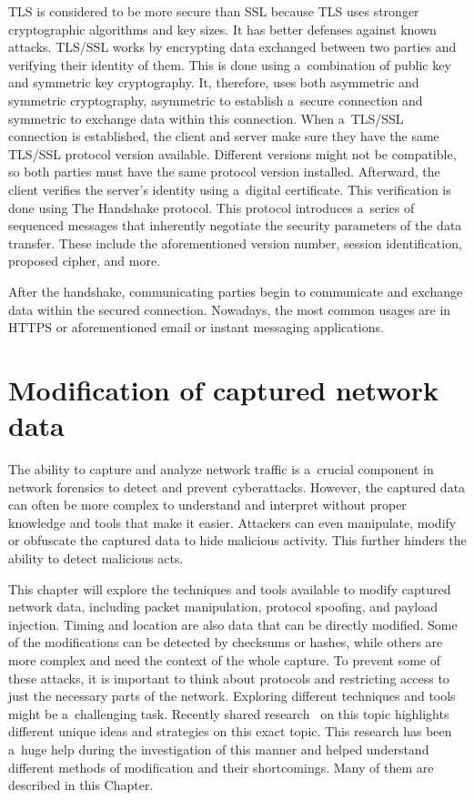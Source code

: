 \documentclass[
  printed,     %
  color,       %
  oneside,     %
  nosansbold,  %
  nocolorbold, %
  nolof,         %
  nolot,         %
]{fithesis4}
\begin{document}
TLS is considered to be more secure than SSL because TLS uses stronger cryptographic algorithms and key sizes. It has better defenses against known attacks. TLS/SSL works by encrypting data exchanged between two parties and verifying their identity of them. This is done using a~combination of public key and symmetric key cryptography. It, therefore, uses both asymmetric and symmetric cryptography, asymmetric to establish a~secure connection and symmetric to exchange data within this connection. When a~TLS/SSL connection is established, the client and server make sure they have the same TLS/SSL protocol version available. Different versions might not be compatible, so both parties must have the same protocol version installed. Afterward, the client verifies the server's identity using a~digital certificate. This verification is done using The Handshake protocol. This protocol introduces a~series of sequenced messages that inherently negotiate the security parameters of the data transfer. These include the aforementioned version number, session identification, proposed cipher, and more.

After the handshake, communicating parties begin to communicate and exchange data within the secured connection. Nowadays, the most common usages are in HTTPS or aforementioned email or instant messaging applications.



\newpage
\chapter{Modification of captured network data}
\label{chap:modif}

The ability to capture and analyze network traffic is a~crucial component in network forensics to detect and prevent cyberattacks. However, the captured data can often be more complex to understand and interpret without proper knowledge and tools that make it easier. Attackers can even manipulate, modify or obfuscate the captured data to hide malicious activity. This further hinders the ability to detect malicious acts.

This chapter will explore the techniques and tools available to modify captured network data, including packet manipulation, protocol spoofing, and payload injection. Timing and location are also data that can be directly modified. Some of the modifications can be detected by checksums or hashes, while others are more complex and need the context of the whole capture. To prevent some of these attacks, it is important to think about protocols and restricting access to just the necessary parts of the network. Exploring different techniques and tools might be a~challenging task. Recently shared research~\cite{Howcanne5:online} on this topic highlights different unique ideas and strategies on this exact topic. This research has been a~huge help during the investigation of this manner and helped understand different methods of modification and their shortcomings. Many of them are described in this Chapter.
\end{document}
